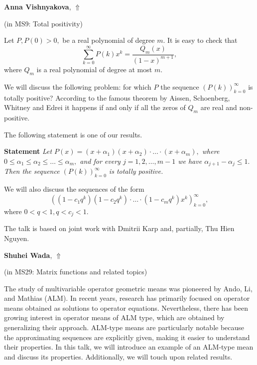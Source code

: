 \documentclass[ILAS2025-program.tex]{subfiles}
\begin{document}
\hypertarget{down0120}{}\begin{ilasabstract}
    
\textbf{Anna Vishnyakova},  \hfill \hyperlink{up0120}{$\Uparrow$}
    
    
(in {\color{mstitle}MS9: Total positivity})
        
\mtskip
    Let $P, P(0) >0,$ be a real polynomial of degree $m.$ It is easy to check that
$$ \sum_{k=0}^\infty P(k) x^k =\frac{Q_m(x)}{(1-x)^{m+1}},  $$
where $Q_m$ is a real polynomial of degree at most $m.$

We will discuss the following problem: for which $P$ the sequence 
$(P(k))_{k=0}^\infty$ is totally positive? According to the famous 
theorem by Aissen, Schoenberg, Whitney and Edrei it happens if and
only if all the zeros of $Q_m$ are real and non-positive.

The following statement is one of our results.

{\bf Statement}  {\it Let $P(x) =(x+\alpha_1)(x+\alpha_2)\cdot \ldots \cdot (x+\alpha_m),$  where $0\leq \alpha_1 \leq \alpha_2 \leq \ldots \leq \alpha_m,$ and for every $j=1, 2, \ldots, m-1$ we have $ \alpha_{j+1} - \alpha_j \leq 1.$  Then the sequence $(P(k))_{k=0}^\infty$ is totally positive. }

We will also discuss the sequences of the form 
$$\left((1-c_1 q^k)(1-c_2 q^k)\cdot \ldots \cdot (1-c_m q^k) x^k\right)_{k=0}^\infty, $$ 
where  $0< q < 1,  q< c_j < 1.$

The talk is based on joint work with Dmitrii Karp and, partially, Thu Hien Nguyen.




\end{ilasabstract}
    

\hypertarget{down0124}{}\begin{ilasabstract}
    
\textbf{Shuhei Wada},  \hfill \hyperlink{up0124}{$\Uparrow$}
    
    
(in {\color{mstitle}MS29: Matrix functions and related topics})
        
\mtskip
    The study of multivariable operator geometric means was pioneered by Ando, Li, and Mathias (ALM). In recent years, research has primarily focused on operator means obtained as solutions to operator equations. Nevertheless, there has been growing interest in operator means of ALM type, which are obtained by generalizing their approach. ALM-type means are particularly notable because the approximating sequences are explicitly given, making it easier to understand their properties. In this talk, we will introduce an example of an ALM-type mean and discuss its properties. Additionally, we will touch upon related results.

\end{ilasabstract}
    
\end{document}
